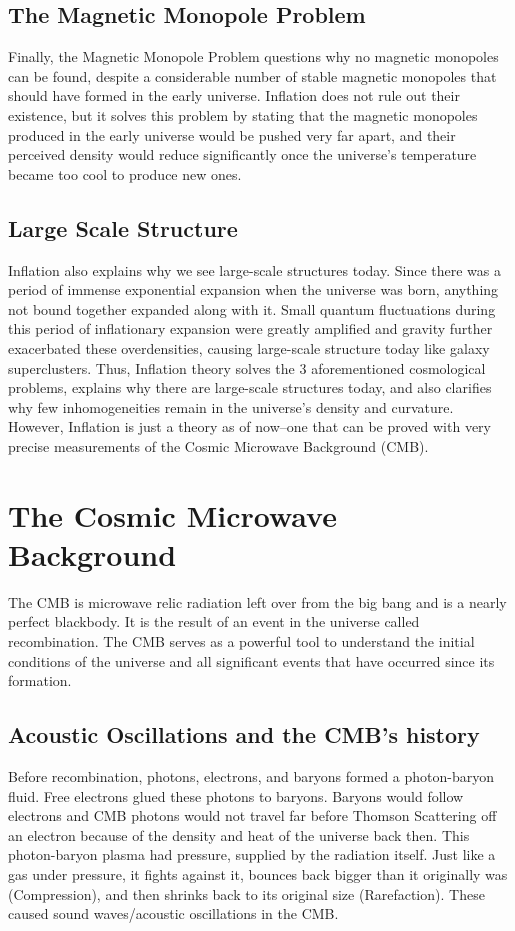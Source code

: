 \documentclass[12pt]{article}
\begin{document}
\subsection{The Magnetic Monopole Problem}
Finally, the Magnetic Monopole Problem questions why no magnetic monopoles can be found, despite a considerable number of stable magnetic monopoles that should have formed in the early universe. Inflation does not rule out their existence, but it solves this problem by stating that the magnetic monopoles produced in the early universe would be pushed very far apart, and their perceived density would reduce significantly once the universe's temperature became too cool to produce new ones.

\subsection{Large Scale Structure}
Inflation also explains why we see large-scale structures today. Since there was a period of immense exponential expansion when the universe was born, anything not bound together expanded along with it. Small quantum fluctuations during this period of inflationary expansion were greatly amplified and gravity further exacerbated these overdensities, causing large-scale structure today like galaxy superclusters. Thus, Inflation theory solves the 3 aforementioned cosmological problems, explains why there are large-scale structures today, and also clarifies why few inhomogeneities remain in the universe’s density and curvature. However, Inflation is just a theory as of now–one that can be proved with very precise measurements of the Cosmic Microwave Background (CMB).

\section{The Cosmic Microwave Background}
The CMB is microwave relic radiation left over from the big bang and is a nearly perfect blackbody. It is the result of an event in the universe called recombination. The CMB serves as a powerful tool to understand the initial conditions of the universe and all significant events that have occurred since its formation.

\subsection{Acoustic Oscillations and the CMB's history}
Before recombination, photons, electrons, and baryons formed a photon-baryon fluid. Free electrons glued these photons to baryons. Baryons would follow electrons and CMB photons would not travel far before Thomson Scattering off an electron because of the density and heat of the universe back then. This photon-baryon plasma had pressure, supplied by the radiation itself. Just like a gas under pressure, it fights against it, bounces back bigger than it originally was (Compression), and then shrinks back to its original size (Rarefaction). These caused sound waves/acoustic oscillations in the CMB.
\end{document}
